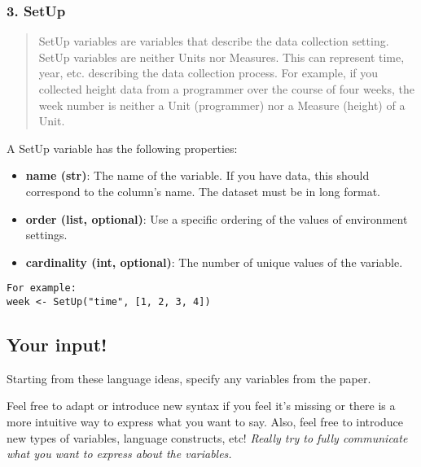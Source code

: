 \subsubsection{3. SetUp}\label{setup}

\begin{quote}
SetUp variables are variables that describe the data collection setting.
SetUp variables are neither Units nor Measures. This can represent time,
year, etc. describing the data collection process. For example, if you
collected height data from a programmer over the course of four weeks,
the week number is neither a Unit (programmer) nor a Measure (height) of
a Unit.
\end{quote}

A SetUp variable has the following properties:
\begin{itemize}
    \item \textbf{name (str)}: The name of the variable. If you have data, this should correspond to the column’s name. The dataset must be in long format.
    \item \textbf{order (list, optional)}: Use a specific ordering of the values of environment settings.
    \item \textbf{cardinality (int, optional)}: The number of unique values of the variable.
\end{itemize}

\begin{verbatim}
For example:
week <- SetUp("time", [1, 2, 3, 4])
\end{verbatim}

\subsection{Your input!}

Starting from these language ideas, specify any variables from the
paper.

Feel free to adapt or introduce new syntax if you feel it's missing or
there is a more intuitive way to express what you want to say. Also,
feel free to introduce new types of variables, language constructs, etc!
\emph{Really try to fully communicate what you want to express about the
variables.}
